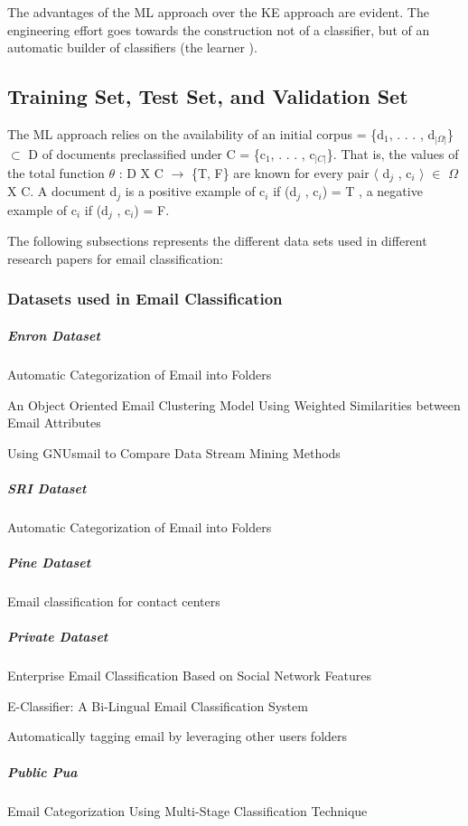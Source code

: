 The advantages of the ML approach over the KE approach are evident. The engineering eﬀort goes towards the construction not of a classiﬁer, but of an automatic builder of classiﬁers (the learner ). \cite{Sebastiani2002}

\subsection{Training Set, Test Set, and Validation Set}
The ML approach relies on the availability of an initial corpus = \{d$_{1}$, . . . , d$_{|\Omega|}$\} $\subset$ D of documents preclassified under C = \{c$_{1}$, . . . , c$_{|C|}$\}. That is, the values of the total function $\theta$ : D X C $\rightarrow$ \{T, F\} are known for every pair $\langle$ d$_{j}$ , c$_{i}$ $\rangle$ $\in$   $\Omega$ X C. A document d$_{j}$ is a positive example of c$_{i}$ if (d$_{j}$ , c$_{i}$) = T , a negative example of c$_{i}$ if
(d$_{j}$ , c$_{i}$) = F.

The following subsections represents the different data sets used  in different research papers for email classification:

\subsubsection{Datasets used in Email Classification}
\subparagraph{Enron Dataset}
    \begin{my_itemize}
        \item Automatic Categorization of Email into Folders \cite{RON04}
        \item An Object Oriented Email Clustering Model Using  Weighted Similarities 
  between Email Attributes \cite{NARESH10}
        \item Using GNUsmail to Compare Data Stream Mining Methods \cite{JOSE11}
    \end{my_itemize}
\subparagraph{SRI Dataset}
    \begin{my_itemize}
        \item Automatic Categorization of Email into Folders \cite{RON04}
    \end{my_itemize}
\subparagraph{Pine Dataset}
    \begin{my_itemize}
        \item Email classification for contact centers \cite{ANI03}
    \end{my_itemize}
\subparagraph{Private Dataset}
    \begin{my_itemize}
        \item Enterprise Email Classification Based on Social Network Features \cite{MIN11}
        \item E-Classifier: A Bi-Lingual Email Classification System \cite{NOUF08} 
        \item Automatically tagging email by leveraging other users folders \cite{YEHUDA11}
    \end{my_itemize}
\subparagraph{Public Pua}
    \begin{my_itemize}
        \item Email Categorization Using Multi-Stage Classification Technique \cite{MD07}
    \end{my_itemize}

